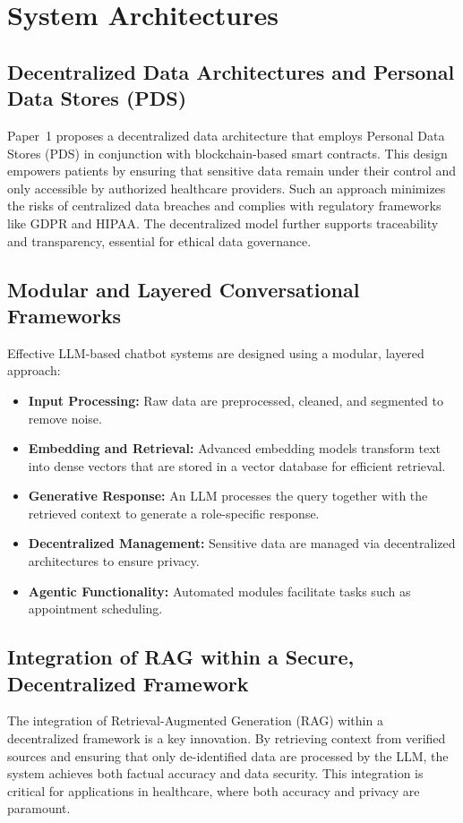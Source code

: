 \section{System Architectures}

\subsection{Decentralized Data Architectures and Personal Data Stores (PDS)}
Paper~1 proposes a decentralized data architecture that employs Personal Data Stores (PDS) in conjunction with blockchain-based smart contracts. This design empowers patients by ensuring that sensitive data remain under their control and only accessible by authorized healthcare providers. Such an approach minimizes the risks of centralized data breaches and complies with regulatory frameworks like GDPR and HIPAA. The decentralized model further supports traceability and transparency, essential for ethical data governance.

\subsection{Modular and Layered Conversational Frameworks}
Effective LLM-based chatbot systems are designed using a modular, layered approach:
\begin{itemize}
    \item \textbf{Input Processing:} Raw data are preprocessed, cleaned, and segmented to remove noise.
    \item \textbf{Embedding and Retrieval:} Advanced embedding models transform text into dense vectors that are stored in a vector database for efficient retrieval.
    \item \textbf{Generative Response:} An LLM processes the query together with the retrieved context to generate a role-specific response.
    \item \textbf{Decentralized Management:} Sensitive data are managed via decentralized architectures to ensure privacy.
    \item \textbf{Agentic Functionality:} Automated modules facilitate tasks such as appointment scheduling.
\end{itemize}

\subsection{Integration of RAG within a Secure, Decentralized Framework}
The integration of Retrieval-Augmented Generation (RAG) within a decentralized framework is a key innovation. By retrieving context from verified sources and ensuring that only de-identified data are processed by the LLM, the system achieves both factual accuracy and data security. This integration is critical for applications in healthcare, where both accuracy and privacy are paramount.

